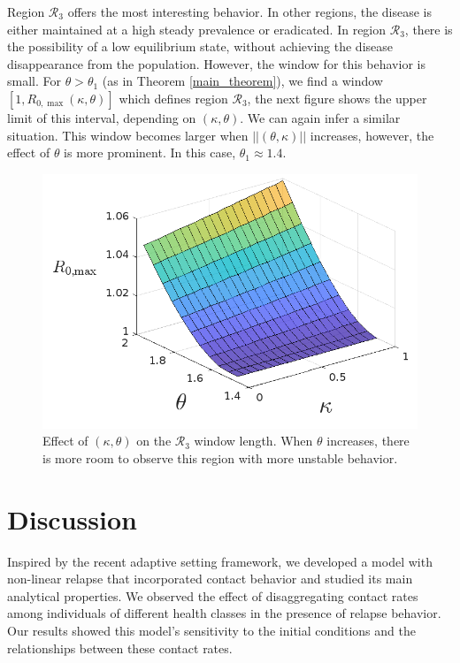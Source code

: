 \documentclass[sn-basic]{sn-jnl}%
\theoremstyle{thmstyleone}%
\theoremstyle{thmstyletwo}%
\theoremstyle{thmstylethree}%
\begin{document}
Region $\mathcal{R}_3$ offers the most interesting behavior. In other regions, the disease is either maintained at a high steady prevalence or eradicated. In region $\mathcal{R}_3$, there is the possibility of a low equilibrium state, without achieving the disease disappearance from the population. However, the window for this behavior is small. For $\theta>\theta_1$ (as in Theorem \ref{main_theorem}), we find a window $[1, R_{0,\max}(\kappa, \theta)]$ which defines region $\mathcal{R}_3$, the next figure shows the upper limit of this interval, depending on $(\kappa, \theta)$. We can again infer a similar situation. This window becomes larger when $||(\theta, \kappa)||$ increases, however, the effect of $\theta$ is more prominent. In this case, $\theta_1 \approx 1.4$.

\begin{figure}[H]
    \centering
    \includegraphics[scale=0.75]{img/Figure_R3_W.png}
    \caption{Effect of $(\kappa, \theta)$ on the $\mathcal{R}_3$ window length. When $\theta$ increases, there is more room to observe this region with more unstable behavior.}
    \label{R3_window_plot}
\end{figure}

\section{Discussion}\label{section5}

Inspired by the recent adaptive setting framework, we developed a model with non-linear relapse that incorporated contact behavior and studied its main analytical properties. We observed the effect of disaggregating contact rates among individuals of different health classes in the presence of relapse behavior. Our results showed this model's sensitivity to the initial conditions and the relationships between these contact rates.
\end{document}

